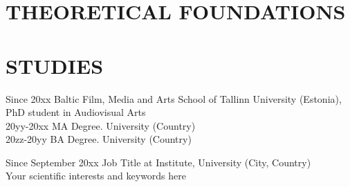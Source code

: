 \documentclass{tlu-thesis}
\begin{document}
\chapter{THEORETICAL FOUNDATIONS}


\chapter{STUDIES}




\printbibliography[heading=none,notcategory=inlineonly]

\appendix



% 
% 


\begin{TLUEnglishCV}
\end{TLUEnglishCV}

Since 20xx \quad Baltic Film, Media and Arts School of Tallinn University (Estonia), PhD student in Audiovisual Arts\\
20yy-20xx \quad MA Degree. University (Country)\\
20zz-20yy \quad BA Degree. University (Country)\\


Since September 20xx \quad
    Job Title at Institute, University (City, Country)\\

Your scientific interests and keywords here 
\end{document}
